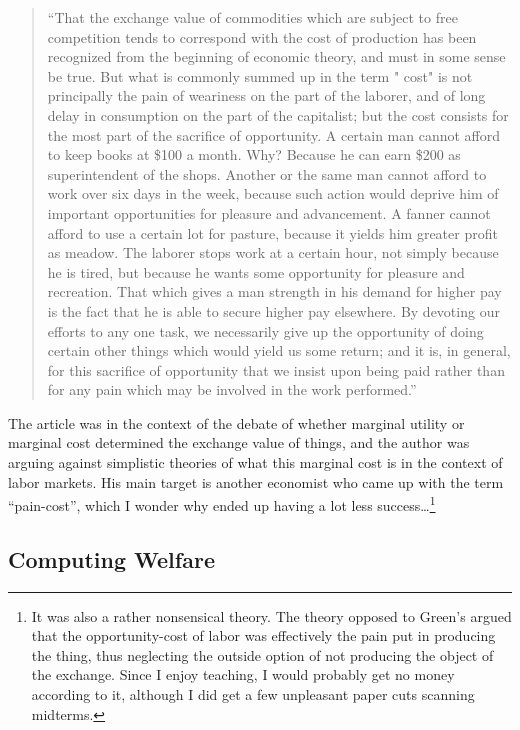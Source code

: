 \documentclass[11pt,english]{article}
\begin{document}
\begin{quote}
``That the exchange value of commodities which are subject
to free competition tends to correspond with the cost of production
has been recognized from the beginning of economic
theory, and must in some sense be true. But what is commonly
summed up in the term " cost" is not principally the pain
of weariness on the part of the laborer, and of long delay in
consumption on the part of the capitalist; but the cost consists
for the most part of the sacrifice of opportunity. A certain
man cannot afford to keep books at \$100 a month. Why?
Because he can earn \$200 as superintendent of the shops. Another
or the same man cannot afford to work over six days in
the week, because such action would deprive him of important
opportunities for pleasure and advancement. A fanner cannot
afford to use a certain lot for pasture, because it yields him
greater profit as meadow. The laborer stops work at a certain
hour, not simply because he is tired, but because he wants
some opportunity for pleasure and recreation. That which
gives a man strength in his demand for higher pay is the fact
that he is able to secure higher pay elsewhere. By devoting
our efforts to any one task, we necessarily give up the opportunity
of doing certain other things which would yield us some
return; and it is, in general, for this sacrifice of opportunity
that we insist upon being paid rather than for any pain which
may be involved in the work performed.''
\end{quote}

The article was in the context of the debate of whether marginal utility or marginal cost determined the exchange value of things, and the author was arguing against simplistic theories of what this marginal cost is in the context of labor markets. His main target is another economist who came up with the term ``pain-cost'', which I wonder why ended up having a lot less success\dots\footnote{It was also a rather nonsensical theory. The theory opposed to Green's argued that the opportunity-cost of labor was effectively the pain put in producing the thing, thus neglecting the outside option of not producing the object of the exchange. Since I enjoy teaching, I would probably get no money according to it, although I did get a few unpleasant paper cuts scanning midterms.}

\subsection{Computing Welfare}
\end{document}
